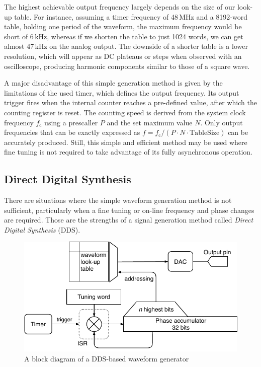 The highest achievable output frequency largely depends on the size of our look-up table. For instance, assuming a timer frequency of 48\,MHz and a 8192-word table, holding one period of the waveform, the maximum frequency would be short of 6\,kHz, whereas if we shorten the table to just 1024 words, we can get almost 47\,kHz on the analog output. The downside of a shorter table is a lower resolution, which will appear as DC plateaus or steps when observed with an oscilloscope, producing harmonic components similar to those of a square wave.

A major disadvantage of this simple generation method is given by the limitations of the used timer, which defines the output frequency. Its output trigger fires when the internal counter reaches a pre-defined value, after which the counting register is reset. The counting speed is derived from the system clock frequency $f_\mathrm{c}$ using a prescaller $P$ and the set maximum value $N$. Only output frequencies that can be exactly expressed as $f=f_\mathrm{c}/(P\cdot N \cdot \mathrm{TableSize})$ can be accurately produced. Still, this simple and efficient method may be used where fine tuning is not required to take advantage of its fully asynchronous operation.

\subsection{Direct Digital Synthesis} \label{sec:theory-dac-dds}

There are situations where the simple waveform generation method is not sufficient, particularly when a fine tuning or on-line frequency and phase changes are required. Those are the strengths of a signal generation method called \textit{Direct Digital Synthesis} (DDS).

\begin{figure}[h]
	\centering
	\includegraphics[scale=1] {img/wavegen-dds.pdf}
	\caption{\label{fig:wavegen-dds}A block diagram of a DDS-based waveform generator}
\end{figure}

